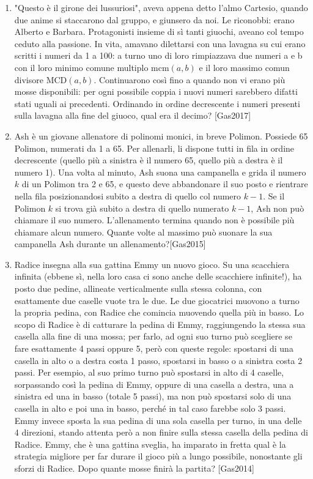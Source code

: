 \documentclass[a4paper]{article}
\theoremstyle{remark}
\theoremstyle{definition}
\newcommand{\subscript}[2]{$#1  #2$}
\begin{document}
\begin{enumerate}[label=(\subscript{c}{\arabic*})]
	\item "Questo è il girone dei lussuriosi", aveva appena detto l’almo Cartesio, quando due anime si staccarono dal gruppo,
	e giunsero da noi. Le riconobbi: erano Alberto e Barbara. Protagonisti insieme di sì tanti giuochi, aveano col tempo
	ceduto alla passione. In vita, amavano dilettarsi con una lavagna su cui erano scritti i numeri da 1 a 100: a turno uno di
	loro rimpiazzava due numeri a e b con il loro minimo comune multiplo mcm$ (a, b) $ e il loro massimo comun divisore
	MCD$ (a, b) $. Continuarono così fino a quando non vi erano più mosse disponibili: per ogni possibile coppia i nuovi
	numeri sarebbero difatti stati uguali ai precedenti. Ordinando in ordine decrescente i numeri presenti sulla lavagna alla
	fine del giuoco, qual era il decimo? [Gas2017]
	
	\item Ash è un giovane allenatore di polinomi monici, in breve Polimon. Possiede 65 Polimon, numerati da 1 a 65. Per
	allenarli, li dispone tutti in fila in ordine decrescente (quello più a sinistra è il numero 65, quello più a destra è il
	numero 1). Una volta al minuto, Ash suona una campanella e grida il numero $ k $ di un Polimon tra 2 e 65, e questo
	deve abbandonare il suo posto e rientrare nella fila posizionandosi subito a destra di quello col numero $ k -1 $. Se il
	Polimon $ k $ si trova già subito a destra di quello numerato $ k -1 $, Ash non può chiamare il suo numero. L’allenamento
	termina quando non è possibile più chiamare alcun numero. Quante volte al massimo può suonare la sua campanella
	Ash durante un allenamento?[Gas2015]
	
	\item Radice insegna alla sua gattina Emmy un nuovo gioco. Su una scacchiera infinita (ebbene sì, nella loro casa ci sono anche delle scacchiere
	infinite!), ha posto due pedine, allineate verticalmente sulla stessa colonna, con esattamente due caselle vuote tra le due. Le due giocatrici
	muovono a turno la propria pedina, con Radice che comincia muovendo quella più in basso. Lo scopo di Radice è di catturare la pedina
	di Emmy, raggiungendo la stessa sua casella alla fine di una mossa; per farlo, ad ogni suo turno può scegliere se fare esattamente 4 passi
	oppure 5, però con queste regole: spostarsi di una casella in alto o a destra costa 1 passo, spostarsi in basso o a sinistra costa 2 passi. Per
	esempio, al suo primo turno può spostarsi in alto di 4 caselle, sorpassando così la pedina di Emmy, oppure di una casella a destra, una a
	sinistra ed una in basso (totale 5 passi), ma non può spostarsi solo di una casella in alto e poi una in basso, perché in tal caso farebbe solo 3
	passi. Emmy invece sposta la sua pedina di una sola casella per turno, in una delle 4 direzioni, stando attenta però a non finire sulla stessa
	casella della pedina di Radice. Emmy, che è una gattina sveglia, ha imparato in fretta qual è la strategia migliore per far durare il gioco più a
	lungo possibile, nonostante gli sforzi di Radice. Dopo quante mosse finirà la partita? [Gas2014]
\end{enumerate}
\end{document}
